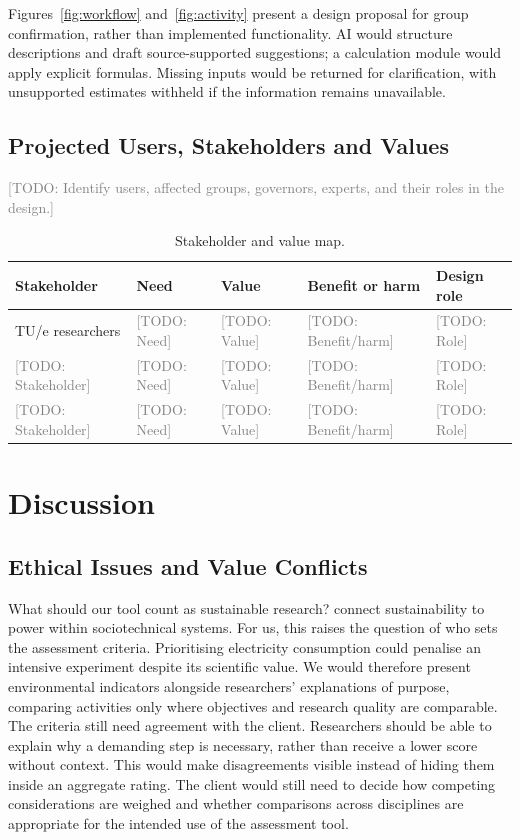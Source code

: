 \documentclass[11pt,a4paper]{article}
\newcommand{\placeholder}[1]{\textcolor{gray}{[TODO: #1]}}
\begin{document}
Figures~\ref{fig:workflow} and~\ref{fig:activity} present a design proposal for group confirmation, rather than implemented functionality. AI would structure descriptions and draft source-supported suggestions; a calculation module would apply explicit formulas. Missing inputs would be returned for clarification, with unsupported estimates withheld if the information remains unavailable.


\FloatBarrier

\FloatBarrier
\subsection{Projected Users, Stakeholders and Values}
\placeholder{Identify users, affected groups, governors, experts, and their roles in the design.}

\begin{table}[htbp]
\centering
\caption{Stakeholder and value map.}
\small
\begin{tabularx}{\textwidth}{@{}p{}XXXp{}@{}}
\toprule
Stakeholder & Need & Value & Benefit or harm & Design role \\
\midrule
TU/e researchers & \placeholder{Need} & \placeholder{Value} & \placeholder{Benefit/harm} & \placeholder{Role} \\
\placeholder{Stakeholder} & \placeholder{Need} & \placeholder{Value} & \placeholder{Benefit/harm} & \placeholder{Role} \\
\placeholder{Stakeholder} & \placeholder{Need} & \placeholder{Value} & \placeholder{Benefit/harm} & \placeholder{Role} \\
\bottomrule
\end{tabularx}
\end{table}

\FloatBarrier
\section{Discussion}

\subsection{Ethical Issues and Value Conflicts}

What should our tool count as sustainable research? \citet{hasselbalch2025sustainability} connect sustainability to power within sociotechnical systems. For us, this raises the question of who sets the assessment criteria. Prioritising electricity consumption could penalise an intensive experiment despite its scientific value. We would therefore present environmental indicators alongside researchers' explanations of purpose, comparing activities only where objectives and research quality are comparable. The criteria still need agreement with the client. Researchers should be able to explain why a demanding step is necessary, rather than receive a lower score without context. This would make disagreements visible instead of hiding them inside an aggregate rating. The client would still need to decide how competing considerations are weighed and whether comparisons across disciplines are appropriate for the intended use of the assessment tool.
\end{document}
